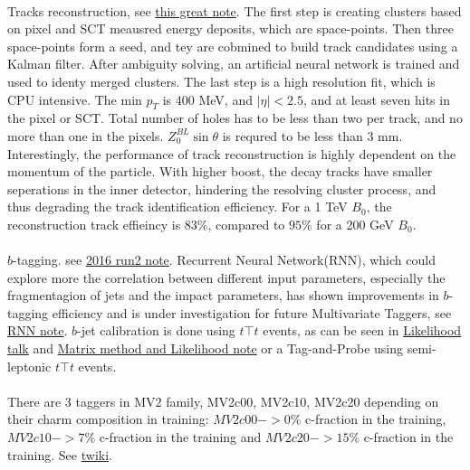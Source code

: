 \paragraph{}
Tracks reconstruction, see \href{https://cds.cern.ch/record/2254947/files/PERF-2015-08-002.pdf}{this great note}. The first step is creating clusters based on pixel and SCT meausred energy deposits, which are space-points. Then three space-points form a seed, and tey are cobmined to build track candidates using a Kalman filter. After ambiguity solving, an artificial neural network is trained and used to identy merged clusters. The last step is a high resolution fit, which is CPU intensive. The min $p_T$ is 400 MeV, and $|\eta| < 2.5$, and at least seven hits in the pixel or SCT. Total number of holes has to be less than two per track, and no more than one in the pixels. $Z_{0}^{BL} \sin{\theta}$ is requred to be less than 3 mm. Interestingly, the performance of track reconstruction is highly dependent on the momentum of the particle. With higher boost, the decay tracks have smaller seperations in the inner detector, hindering the resolving cluster process, and thus degrading the track identification efficiency. For a 1 TeV $B_{0}$, the reconstruction track effieincy is $83\%$, compared to $95\%$ for a 200 GeV $B_{0}$.

\paragraph{}
$b$-tagging. see \href{https://cds.cern.ch/record/2160731/files/ATL-PHYS-PUB-2016-012.pdf}{2016 run2 note}. Recurrent Neural Network(RNN), which could explore more the correlation between different input parameters, especially the fragmentagion of jets and the impact parameters, has shown improvements in $b$-tagging efficiency and is under investigation for future Multivariate Taggers, see \href{https://cds.cern.ch/record/2253371}{RNN note}. $b$-jet calibration is done using $t\top{t}$ events, as can be seen in \href{https://indico.cern.ch/event/622490/contributions/2510894/attachments/1425202/2191220/ttbar_PDF_Calibration_MVA_Training_Approval_140317.pdf}{Likelihood talk} and \href{https://cds.cern.ch/record/1538335/files/ATL-COM-PHYS-2013-395.pdf}{Matrix method and Likelihood note} or a Tag-and-Probe using semi-leptonic $t\top{t}$ events.

\paragraph{}
There are 3 taggers in MV2 family, MV2c00, MV2c10, MV2c20 depending on their charm composition in training: $MV2c00->0\%$ c-fraction in the training, $MV2c10->7\%$ c-fraction in the training and $MV2c20->15\%$ c-fraction in the training. See \href{https://twiki.cern.ch/twiki/bin/view/AtlasProtected/BTaggingMV2}{twiki}.

